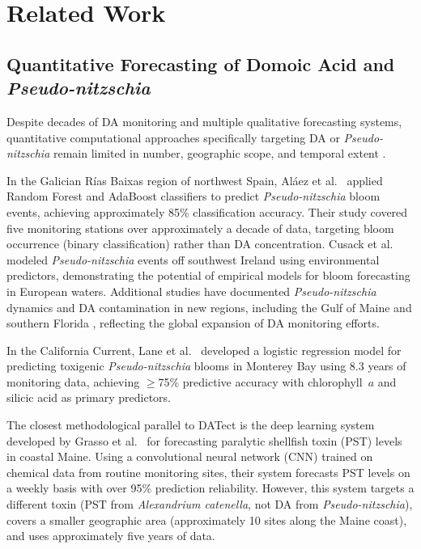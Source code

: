 \documentclass[toxins,article,submit,moreauthors]{Definitions/mdpi}
\begin{document}
\section{Related Work}
\label{sec:related-work}

\subsection{Quantitative Forecasting of Domoic Acid and \textit{Pseudo-nitzschia}}
\label{sec:rw-da-forecasting}

Despite decades of DA monitoring and multiple qualitative forecasting systems, quantitative computational approaches specifically targeting DA or \textit{Pseudo-nitzschia} remain limited in number, geographic scope, and temporal extent \cite{Anderson2012, McGillicuddy2010}.

In the Galician R\'ias Baixas region of northwest Spain, Al\'aez et al.\ \cite{Alaez2021} applied Random Forest and AdaBoost classifiers to predict \textit{Pseudo-nitzschia} bloom events, achieving approximately 85\% classification accuracy. Their study covered five monitoring stations over approximately a decade of data, targeting bloom occurrence (binary classification) rather than DA concentration. Cusack et al.\ \cite{Cusack2015} modeled \textit{Pseudo-nitzschia} events off southwest Ireland using environmental predictors, demonstrating the potential of empirical models for bloom forecasting in European waters. Additional studies have documented \textit{Pseudo-nitzschia} dynamics and DA contamination in new regions, including the Gulf of Maine \cite{Clark2021} and southern Florida \cite{Schreiber2023}, reflecting the global expansion of DA monitoring efforts.

In the California Current, Lane et al.\ \cite{Lane2009} developed a logistic regression model for predicting toxigenic \textit{Pseudo-nitzschia} blooms in Monterey Bay using 8.3 years of monitoring data, achieving $\geq$75\% predictive accuracy with chlorophyll~$a$ and silicic acid as primary predictors.

The closest methodological parallel to DATect is the deep learning system developed by Grasso et al.\ \cite{Grasso2019} for forecasting paralytic shellfish toxin (PST) levels in coastal Maine. Using a convolutional neural network (CNN) trained on chemical data from routine monitoring sites, their system forecasts PST levels on a weekly basis with over 95\% prediction reliability. However, this system targets a different toxin (PST from \textit{Alexandrium catenella}, not DA from \textit{Pseudo-nitzschia}), covers a smaller geographic area (approximately 10 sites along the Maine coast), and uses approximately five years of data.
\end{document}
